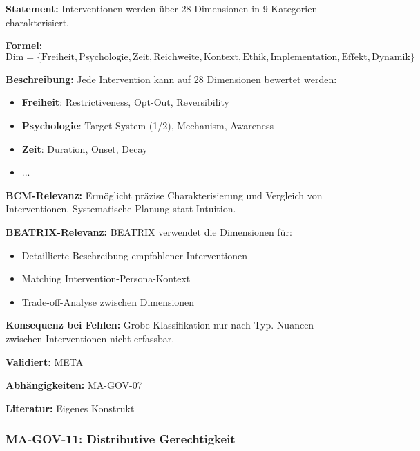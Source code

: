 \textbf{Statement:} Interventionen werden über 28 Dimensionen in 9 Kategorien charakterisiert.

\textbf{Formel:}
\begin{equation}
\text{Dim} = \{\text{Freiheit}, \text{Psychologie}, \text{Zeit}, \text{Reichweite}, \text{Kontext}, \text{Ethik}, \text{Implementation}, \text{Effekt}, \text{Dynamik}\}
\end{equation}

\textbf{Beschreibung:}
Jede Intervention kann auf 28 Dimensionen bewertet werden:
\begin{itemize}
    \item \textbf{Freiheit}: Restrictiveness, Opt-Out, Reversibility
    \item \textbf{Psychologie}: Target System (1/2), Mechanism, Awareness
    \item \textbf{Zeit}: Duration, Onset, Decay
    \item ...
\end{itemize}

\textbf{BCM-Relevanz:}
Ermöglicht präzise Charakterisierung und Vergleich von Interventionen. Systematische Planung statt Intuition.

\textbf{BEATRIX-Relevanz:}
BEATRIX verwendet die Dimensionen für:
\begin{itemize}
    \item Detaillierte Beschreibung empfohlener Interventionen
    \item Matching Intervention-Persona-Kontext
    \item Trade-off-Analyse zwischen Dimensionen
\end{itemize}

\textbf{Konsequenz bei Fehlen:}
Grobe Klassifikation nur nach Typ. Nuancen zwischen Interventionen nicht erfassbar.

\textbf{Validiert:} META

\textbf{Abhängigkeiten:} MA-GOV-07

\textbf{Literatur:} Eigenes Konstrukt


\subsubsection*{MA-GOV-11: Distributive Gerechtigkeit}

